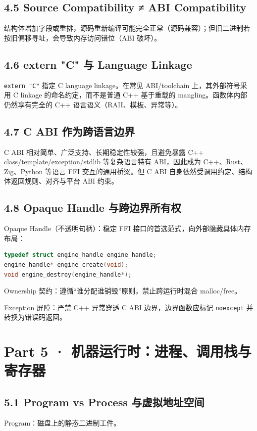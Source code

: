 \documentclass[11pt,a4paper]{article}
\begin{document}
\subsection{4.5 Source Compatibility ≠ ABI Compatibility}
结构体增加字段或重排，源码重新编译可能完全正常（源码兼容）；但旧二进制若按旧偏移寻址，会导致内存访问错位（ABI 破坏）。

\subsection{4.6 extern "C" 与 Language Linkage}
\texttt{extern "C"} 指定 C language linkage。在常见 ABI/toolchain 上，其外部符号采用 C linkage 的命名约定，而不是普通 C++ 基于重载的 mangling。函数体内部仍然享有完全的 C++ 语言语义（RAII、模板、异常等）。

\subsection{4.7 C ABI 作为跨语言边界}
C ABI 相对简单、广泛支持、长期稳定性较强，且避免暴露 C++ class/template/exception/stdlib 等复杂语言特有 ABI，因此成为 C++、Rust、Zig、Python 等语言 FFI 交互的通用桥梁。但 C ABI 自身依然受调用约定、结构体返回规则、对齐与平台 ABI 约束。

\subsection{4.8 Opaque Handle 与跨边界所有权}
Opaque Handle（不透明句柄）：稳定 FFI 接口的首选范式，向外部隐藏具体内存布局：

\begin{lstlisting}[language=cpp]
typedef struct engine_handle engine_handle;
engine_handle* engine_create(void);
void engine_destroy(engine_handle*);
\end{lstlisting}
Ownership 契约：遵循“谁分配谁销毁”原则，禁止跨运行时混合 malloc/free。

Exception 屏障：严禁 C++ 异常穿透 C ABI 边界，边界函数应标记 \texttt{noexcept} 并转换为错误码返回。

\section{Part 5 · 机器运行时：进程、调用栈与寄存器}
\subsection{5.1 Program vs Process 与虚拟地址空间}
Program：磁盘上的静态二进制工件。
\end{document}
